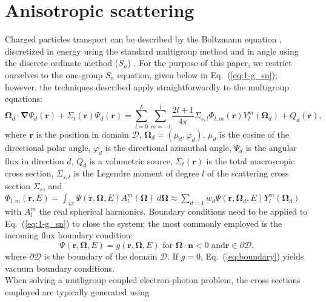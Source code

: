 \documentclass[preprint,10pt]{elsarticle}
\newcommand\bn{\boldsymbol{\nabla}}
\newcommand\bo{\boldsymbol{\Omega}}
\newcommand\br{\mathbf{r}}
\newcommand\bs{\boldsymbol}
\renewcommand{\(}{\left(}
\renewcommand{\)}{\right)}
\renewcommand{\[}{\left[}
\renewcommand{\]}{\right]}
\newcommand{\eqt}[1]{Eq.~(\ref{#1})}                     %
\newcommand{\mt}[1]{\marginpar{{\singlespacing \textcolor{red}{{\tiny #1}}}}}
\begin{document}
\section{Anisotropic scattering} \label{sec:anisotropy}

Charged particles transport can be described by the Boltzmann equation
\cite{graal}, discretized in energy using the standard multigroup method
and in angle using the discrete ordinate method ($S_n$)
\mt{Reuss, really?}\cite{reuss}. For the purpose of this paper, we restrict ourselves to the one-group $S_n$ equation,
given below in \eqt{eq:1-g_sn}; however, the techniques described apply straightforwardly to the multigroup equations:
%
\begin{equation}
\bo_d \cdot \bn \Psi_d(\br) + \Sigma_{t}(\br) \Psi_d(\br) = 
\sum_{l=0}^L\sum_{m=-l}^l \frac{2l+1}{4\pi}\Sigma_{s,l}
\Phi_{l,m}(\br)Y_l^m(\bo_d) + Q_d(\br) ,
\label{eq:1-g_sn}
\end{equation}
%
where $\br$ is the position in domain $\mathcal{D}$, $\bo_d=(\mu_d,\varphi_d)$, 
$\mu_d$ is the cosine of the directional polar angle,
$\varphi_d$ is the directional azimuthal angle, $\Psi_d$ is
the angular flux in direction $d$, $Q_d$ is a volumetric source, $\Sigma_{t}(\br)$ is the total 
macroscopic cross section, $\Sigma_{s,l}$ is the Legendre moment of 
degree $l$ of the scattering cross section $\Sigma_s$, and $\Phi_{l,m}(\br,E)= \int_{4\pi}\Psi(\br,\bo,E)A_l^{m}(\bo)\ d\bo
\approx \sum_{d=1} w_d \Psi(\br,\bo_d,E)Y_l^{m}(\bo_d)$ with  $A_l^m$ the 
real spherical harmonics.
%
Boundary conditions need to be applied to \eqt{eq:1-g_sn} to close the system; the most
commonly employed is the incoming flux boundary condition:
%
\begin{equation}
\Psi(\br,\bo,E) = g(\br,\bo,E)\textrm{ for }\bo\cdot\bs{n}<0\textrm{ and
}\br\in \partial \mathcal{D},
\label{eq:boundary}
\end{equation} 
%
where $\partial \mathcal{D}$ is the boundary of the domain $\mathcal{D}$. If $g=0$, \eqt{eq:boundary}
yields vacuum boundary conditions.\\
When solving a mutligroup coupled electron-photon problem, the cross sections employed are typically generated using
\end{document}

